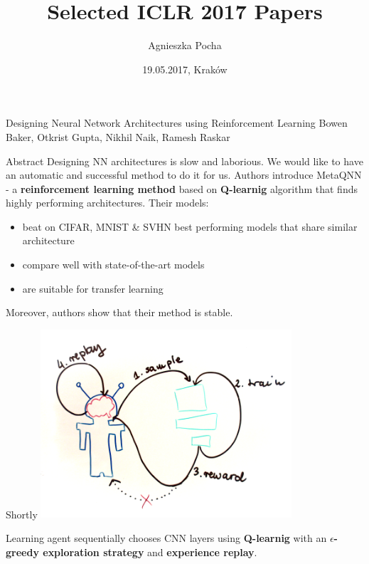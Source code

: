\documentclass[15pt]{beamer}
\title[ICLR zapłata]{Selected ICLR 2017 Papers}
\author{Agnieszka Pocha}
\institute{Jagiellonian University}
\date{19.05.2017, Kraków}
\begin{document}
\begin{frame}
  \titlepage
\end{frame}




\begin{frame}{Designing Neural Network Architectures using Reinforcement Learning}
  Bowen Baker, Otkrist Gupta, Nikhil Naik, Ramesh Raskar

  \vspace{0.05in}

  \begin{block}{Abstract}
  Designing NN architectures is slow and laborious. We would like to have an automatic and successful method to do it for us.\vspace{0.04in}
  Authors introduce MetaQNN - a \textbf{reinforcement learning method} based on \textbf{Q-learnig} algorithm that finds highly performing architectures.\vspace{0.05in}
  Their models:
  \begin{itemize}
  \item beat on CIFAR, MNIST \& SVHN best performing models that share similar architecture
  \item compare well with state-of-the-art models
  \item are suitable for transfer learning
  \end{itemize}
  Moreover, authors show that their method is stable.

  \end{block}
\end{frame}


\begin{frame}{Shortly}
\centering \includegraphics[width=0.7\textwidth]{model.png}

\raggedright
  Learning agent sequentially chooses CNN layers using \textbf{Q-learnig} with an \textbf{$\epsilon$-greedy exploration strategy} and \textbf{experience replay}.
\end{frame}
\end{document}
